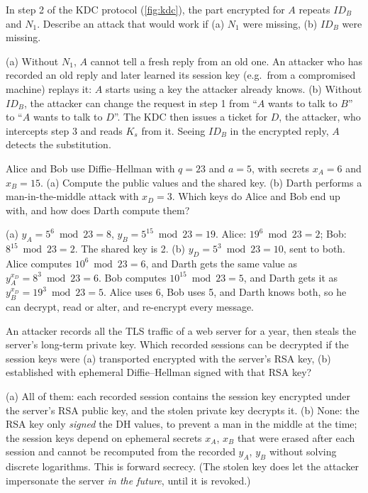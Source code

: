 \begin{exercise}
In step 2 of the KDC protocol (\cref{fig:kdc}), the part encrypted for $A$ repeats $ID_B$ and $N_1$. Describe an attack that would work if (a) $N_1$ were missing, (b) $ID_B$ were missing.
\end{exercise}
\begin{solution}
(a) Without $N_1$, $A$ cannot tell a fresh reply from an old one. An attacker who has recorded an old reply and later learned its session key (e.g.\ from a compromised machine) replays it: $A$ starts using a key the attacker already knows. (b) Without $ID_B$, the attacker can change the request in step 1 from \enquote{$A$ wants to talk to $B$} to \enquote{$A$ wants to talk to $D$}. The KDC then issues a ticket for $D$, the attacker, who intercepts step 3 and reads $K_s$ from it. Seeing $ID_B$ in the encrypted reply, $A$ detects the substitution.
\end{solution}

\begin{exercise}
Alice and Bob use Diffie--Hellman with $q = 23$ and $a = 5$, with secrets $x_A = 6$ and $x_B = 15$. (a) Compute the public values and the shared key. (b) Darth performs a man-in-the-middle attack with $x_D = 3$. Which keys do Alice and Bob end up with, and how does Darth compute them?
\end{exercise}
\begin{solution}
(a) $y_A = 5^6 \bmod 23 = 8$, $y_B = 5^{15} \bmod 23 = 19$. Alice: $19^6 \bmod 23 = 2$; Bob: $8^{15} \bmod 23 = 2$. The shared key is 2.
(b) $y_D = 5^3 \bmod 23 = 10$, sent to both. Alice computes $10^6 \bmod 23 = 6$, and Darth gets the same value as $y_A^{x_D} = 8^3 \bmod 23 = 6$. Bob computes $10^{15} \bmod 23 = 5$, and Darth gets it as $y_B^{x_D} = 19^3 \bmod 23 = 5$. Alice uses 6, Bob uses 5, and Darth knows both, so he can decrypt, read or alter, and re-encrypt every message.
\end{solution}

\begin{exercise}
An attacker records all the TLS traffic of a web server for a year, then steals the server's long-term private key. Which recorded sessions can be decrypted if the session keys were (a) transported encrypted with the server's RSA key, (b) established with ephemeral Diffie--Hellman signed with that RSA key?
\end{exercise}
\begin{solution}
(a) All of them: each recorded session contains the session key encrypted under the server's RSA public key, and the stolen private key decrypts it. (b) None: the RSA key only \emph{signed} the DH values, to prevent a man in the middle at the time; the session keys depend on ephemeral secrets $x_A$, $x_B$ that were erased after each session and cannot be recomputed from the recorded $y_A$, $y_B$ without solving discrete logarithms. This is forward secrecy. (The stolen key does let the attacker impersonate the server \emph{in the future}, until it is revoked.)
\end{solution}

